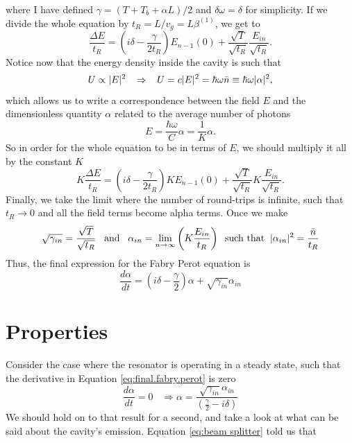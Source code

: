 where I have defined $\gamma=(T+T_b+\alpha L)/2$ and $\delta\omega=\delta$ for simplicity. If we divide the whole equation by $t_R=L/v_g=L\beta^{(1)}$, we get to
\begin{equation}
    \frac{\Delta E}{t_R}=\left(i\delta-\frac{\gamma}{2t_R}\right)E_{n-1}(0)+\frac{\sqrt{T}}{\sqrt{t_R}}\frac{E_{in}}{\sqrt{t_R}}.
\end{equation}
Notice now that the energy density inside the cavity is such that
\begin{equation}
    U\propto |E|^2\;\;\;\Rightarrow\;\;\;U=c|E|^2=\hbar\omega\Bar{n}\equiv\hbar\omega|\alpha|^2,
\end{equation}
which allows us to write a correspondence between the field $E$ and the dimensionless quantity $\alpha$ related to the average number of photons
\begin{equation}
    E=\frac{\hbar\omega}{C}\alpha=\frac{1}{K}\alpha.
\end{equation}
So in order for the whole equation to be in terms of $E$, we should multiply it all by the constant $K$
\begin{equation}
    K\frac{\Delta E}{t_R}=\left(i\delta-\frac{\gamma}{2t_R}\right)KE_{n-1}(0)+\frac{\sqrt{T}}{\sqrt{t_R}}K\frac{E_{in}}{\sqrt{t_R}}.
\end{equation}
Finally, we take the limit where the number of round-trips is infinite, such that $t_R\rightarrow 0$ and all the field terms become alpha terms. Once we make
\begin{equation}
    \sqrt{\gamma_{in}}=\frac{\sqrt{T}}{\sqrt{t_R}}\;\;\;\text{and}\;\;\;\alpha_{in}=\lim_{n\rightarrow\infty}\left(K\frac{E_{in}}{t_R}\right)\;\;\text{such that}\;\;|\alpha_{in}|^2=\frac{\Bar{n}}{t_R}
\end{equation}
Thus, the final expression for the Fabry Perot equation is
\begin{equation}
    \boxed{\frac{d\alpha}{dt}=\left(i\delta-\frac{\gamma}{2}\right)\alpha+\sqrt{\gamma_{in}}\alpha_{in}}
    \label{eq:final.fabry.perot}
\end{equation}

\section*{Properties}
Consider the case where the resonator is operating in a steady state, such that the derivative in Equation \ref{eq:final.fabry.perot} is zero
\begin{equation}
    \frac{d\alpha}{dt}=0\;\;\;\Rightarrow \alpha=\frac{\sqrt{\gamma_{in}}\alpha_{in}}{\left(\frac{\gamma}{2}-i\delta\right)}
\end{equation}
We should hold on to that result for a second, and take a look at what can be said about the cavity's emission. Equation \ref{eq:beam splitter} told us that


